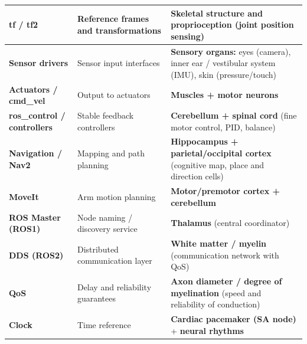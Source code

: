 \begin{table}[h!]
{\begin{tabular}{|>{\raggedright\arraybackslash}p{3cm}|>{\raggedright\arraybackslash}p{4cm}|>{\raggedright\arraybackslash}p{8.5cm}|}
                \hline
                \textbf{tf / tf2}                   & Reference frames and transformations   & \textbf{Skeletal structure and proprioception (joint position sensing)}                                             \\
                \hline
                \textbf{Sensor drivers}             & Sensor input interfaces                & \textbf{Sensory organs:} eyes (camera), inner ear / vestibular system (IMU), skin (pressure/touch)                  \\
                \hline
                \textbf{Actuators / cmd\_vel}       & Output to actuators                    & \textbf{Muscles + motor neurons}                                                                                    \\
                \hline
                \textbf{ros\_control / controllers} & Stable feedback controllers            & \textbf{Cerebellum + spinal cord} (fine motor control, PID, balance)                                                \\
                \hline
                \textbf{Navigation / Nav2}          & Mapping and path planning              & \textbf{Hippocampus + parietal/occipital cortex} (cognitive map, place and direction cells)                         \\
                \hline
                \textbf{MoveIt}                     & Arm motion planning                    & \textbf{Motor/premotor cortex + cerebellum}                                                                         \\
                \hline
                \textbf{ROS Master (ROS1)}          & Node naming / discovery service        & \textbf{Thalamus} (central coordinator)                                                                             \\
                \hline
                \textbf{DDS (ROS2)}                 & Distributed communication layer        & \textbf{White matter / myelin} (communication network with QoS)                                                     \\
                \hline
                \textbf{QoS}                        & Delay and reliability guarantees       & \textbf{Axon diameter / degree of myelination} (speed and reliability of conduction)                                \\
                \hline
                \textbf{Clock}                      & Time reference                         & \textbf{Cardiac pacemaker (SA node)} + \textbf{neural rhythms}                                                      \\

\end{tabular}}
\end{table}
